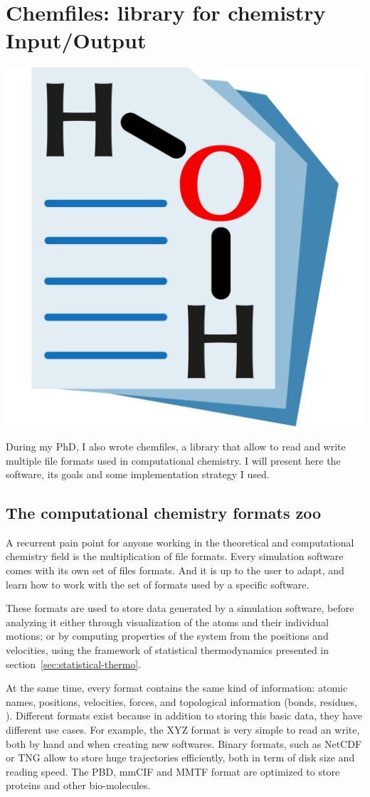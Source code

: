 \documentclass[thesis]{subfiles}
\begin{document}
\OnlyInSubfile{\appendix}
\OnlyInSubfile{\setcounter{chapter}{2}}

\chapter{Chemfiles: library for chemistry Input/Output}

\vfill
\begin{center}
    \includegraphics[width=.3\textwidth]{figures/images/chemfiles-logo}
\end{center}
\vfill

During my PhD, I also wrote chemfiles, a library that allow to read and write
multiple file formats used in computational chemistry. I will present here the
software, its goals and some implementation strategy I used.

\newpage
\section{The computational chemistry formats zoo}

A recurrent pain point for anyone working in the theoretical and computational
chemistry field is the multiplication of file formats. Every simulation software
comes with its own set of files formats. And it is up to the user to adapt, and
learn how to work with the set of formats used by a specific software.

These formats are used to store data generated by a simulation software, before
analyzing it either through visualization of the atoms and their individual
motions; or by computing properties of the system from the positions and
velocities, using the framework of statistical thermodynamics presented in
section~\ref{sec:statistical-thermo}.

At the same time, every format contains the same kind of information: atomic
names, positions, velocities, forces, and topological information (bonds,
residues, \etc). Different formats exist because in addition to storing this
basic data, they have different use cases. For example, the XYZ format is very
simple to read an write, both by hand and when creating new softwares. Binary
formats, such as NetCDF or TNG allow to store huge trajectories efficiently,
both in term of disk size and reading speed. The PBD, mmCIF and MMTF format are
optimized to store proteins and other bio-molecules.
\end{document}
